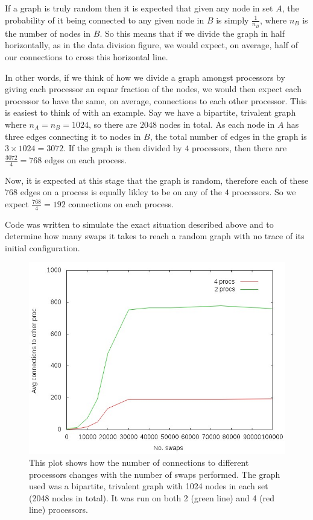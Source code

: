 \documentclass[pdftex,12pt,a4paper]{article}
\begin{document}
If a graph is truly random then it is expected that given any node in set $A$, the probability of it being connected to any given node in $B$ is simply $\frac{1}{n_B}$, where $n_B$ is the number of nodes in $B$. So this means that if we divide the graph in half horizontally, as in the data division figure, we would expect, on average, half of our connections to cross this horizontal line.

In other words, if we think of how we divide a graph amongst processors by giving each processor an equar fraction of the nodes, we would then expect each processor to have the same, on average, connections to each other processor. This is easiest to think of with an example. Say we have a bipartite, trivalent graph where $n_A = n_B = 1024$, so there are $2048$ nodes in total. As each node in $A$ has three edges connecting it to nodes in $B$, the total number of edges in the graph is $3 \times 1024 = 3072$. If the graph is then divided by $4$ processors, then there are $\frac{3072}{4} = 768$ edges on each process.

Now, it is expected at this stage that the graph is random, therefore each of these $768$ edges on a process is equally likley to be on any of the $4$ processors. So we expect $\frac{768}{4} = 192$ connections on each process.

Code was written to simulate the exact situation described above and to determine how many swaps it takes to reach a random graph with no trace of its initial configuration.

\begin{figure}

\centering
\includegraphics[scale=0.8]{swap_random_1024_by_2_nodegraph.jpg}
\caption{This plot shows how the number of connections to different processors changes with the number of swaps performed. The graph used was a bipartite, trivalent graph with 1024 nodes in each set (2048 nodes in total). It was run on both 2 (green line) and 4 (red line) processors.}
\end{figure}
\end{document}

